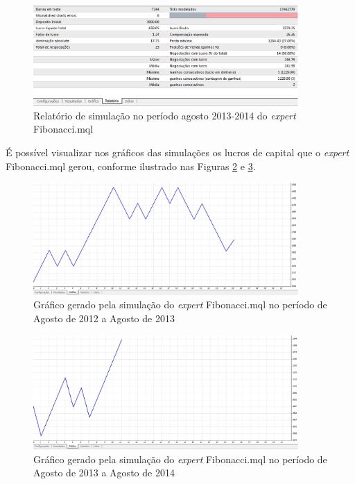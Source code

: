 \begin{figure}[H]
\centering
\includegraphics[width=0.9\textwidth]{figuras/protocoloFib2}
\caption{Relatório de simulação no período agosto 2013-2014 do \textit{expert} Fibonacci.mql}
\label{protocoloFib2}
\end{figure}

É possível visualizar nos gráficos das simulações os lucros de capital que o \textit{expert} Fibonacci.mql gerou, conforme ilustrado nas Figuras \ref{protocoloFib3} e \ref{protocoloFib4}.

\begin{figure}[H]
\centering
\includegraphics[width=0.9\textwidth]{figuras/protocoloFib3}
\caption{Gráfico gerado pela simulação do \textit{expert} Fibonacci.mql no período de Agosto de 2012 a Agosto de 2013}
\label{protocoloFib3}
\end{figure}

\begin{figure}[H]
\centering
\includegraphics[width=0.9\textwidth]{figuras/protocoloFib4}
\caption{Gráfico gerado pela simulação do \textit{expert} Fibonacci.mql no período de Agosto de 2013 a Agosto de 2014}
\label{protocoloFib4}
\end{figure}

